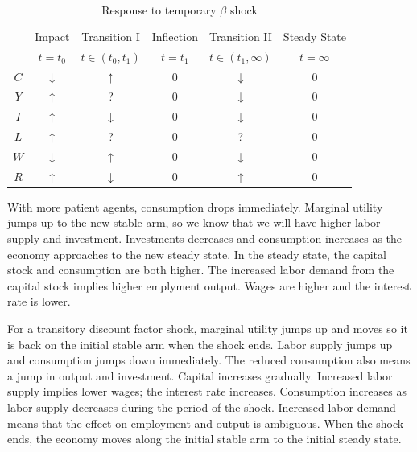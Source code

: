 \documentclass[11pt]{amsart}
\begin{document}
\begin{table}[htp]
\caption{Response to temporary $\beta$ shock}
\begin{center}
\begin{tabular}{c|c|c|c|c|c}
			& Impact  & Transition I          & Inflection & Transition II & Steady State  \\
		& $t=t_0$ & $t \in (t_0, t_1)$ & $t = t_1$ & $t \in (t_1, \infty)$ & $t = \infty$ \\
		\hline 
		$C$          & $\downarrow$ &   $\uparrow$      &   0      & $\downarrow$ &    0\\
		$Y$          &    $\uparrow$   &    ?    &    0    &  $\downarrow$  &      0\\
		$I$           &   $\uparrow$    &  $\downarrow$  & 0 & $\downarrow$  &    0\\
		$L$          &   $\uparrow$    &   ?      & 0     &  ? &      0\\
		$W$         & $\downarrow$ &    $\uparrow$     &    0     & $\downarrow$ &  0   \\
		$R$          &  $\uparrow$    &     $\downarrow$     &    0     & $\uparrow$  &  0 \\
		\hline
\end{tabular}
\end{center}
\label{default}
\end{table}

With more patient agents, consumption drops immediately.
Marginal utility jumps up to the new stable arm, so we know that we will have higher labor supply and investment.
Investments decreases and consumption increases as the economy approaches to the new steady state.
In the steady state, the capital stock and consumption are both higher. 
The increased labor demand from the capital stock implies higher emplyment output. 
Wages are higher and the interest rate is lower. 


For a transitory discount factor shock, marginal utility jumps up and moves so it is back on the initial stable arm when the shock ends. 
Labor supply jumps up and consumption jumps down immediately. 
The reduced consumption also means a jump in output and investment. 
Capital increases gradually. 
Increased labor supply implies lower wages; the interest rate increases.
Consumption increases as labor supply decreases during the period of the shock. 
Increased labor demand means that the effect on employment and output is ambiguous.
When the shock ends, the economy moves along the initial stable arm to the initial steady state. 
\end{document}
